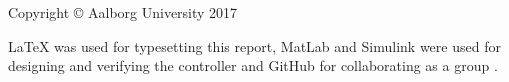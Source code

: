 \thispagestyle{empty}
{\small
\strut\vfill %
\noindent Copyright \copyright{} Aalborg University 2017\par
\vspace{0.2cm}
\noindent \LaTeX \: was used for typesetting this report,
MatLab and Simulink were used for designing and verifying the controller and
GitHub for collaborating as a group \cite{GitHub}.
}
\clearpage